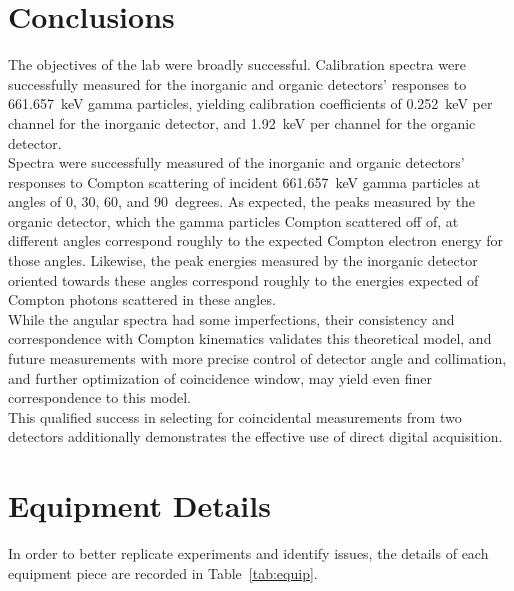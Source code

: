 \documentclass[12pt]{article}
\begin{document}
\section{Conclusions}\label{sec:conc}

The objectives of the lab were broadly successful. Calibration spectra were successfully measured for the inorganic and organic detectors' responses to 661.657~keV gamma particles, yielding calibration coefficients of 0.252~keV per channel for the inorganic detector, and 1.92~keV per channel for the organic detector.\\

Spectra were successfully measured of the inorganic and organic detectors' responses to Compton scattering of incident 661.657~keV gamma particles at angles of 0, 30, 60, and 90~degrees.
As expected, the peaks measured by the organic detector, which the gamma particles Compton scattered off of, at different angles correspond roughly to the expected Compton electron energy for those angles.
Likewise, the peak energies measured by the inorganic detector oriented towards these angles correspond roughly to the energies expected of Compton photons scattered in these angles.\\

While the angular spectra had some imperfections, their consistency and correspondence with Compton kinematics validates this theoretical model, and future measurements with more precise control of detector angle and collimation, and further optimization of coincidence window, may yield even finer correspondence to this model.\\

This qualified success in selecting for coincidental measurements from two detectors additionally demonstrates the effective use of direct digital acquisition.


% 
\pagebreak\printbibliography

\appendix
\pagebreak
\FloatBarrier\section{Equipment Details}\label{app:equip}
In order to better replicate experiments and identify issues, the details of each equipment piece are recorded in Table~\ref{tab:equip}.
\end{document}
